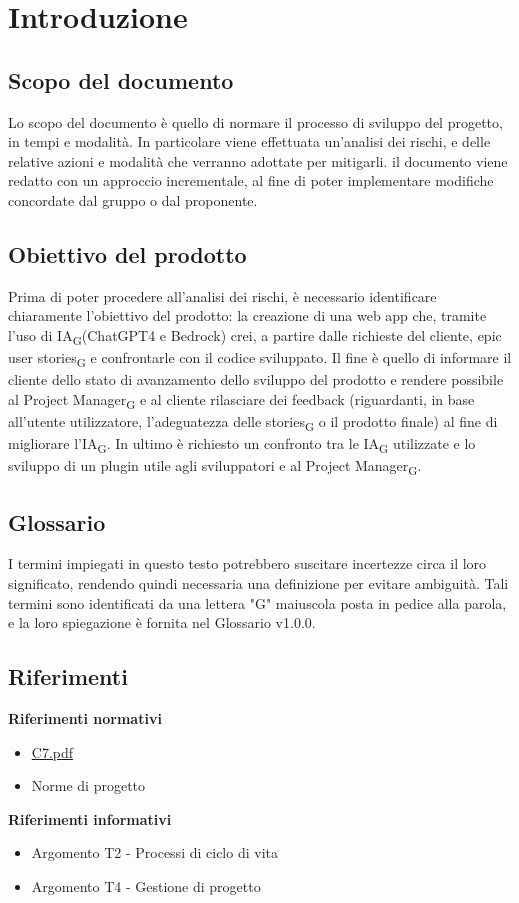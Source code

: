 \documentclass{article}
\begin{document}
\section{Introduzione}
\subsection{Scopo del documento}
Lo scopo del documento è quello di normare il processo di sviluppo del progetto, in tempi e modalità. In particolare viene effettuata un'analisi dei rischi, e delle relative azioni e modalità che verranno adottate per mitigarli. il documento viene redatto con un approccio incrementale, al fine di poter implementare modifiche concordate dal gruppo o dal proponente.

\subsection{Obiettivo del prodotto}
Prima di poter procedere all'analisi dei rischi, è necessario identificare chiaramente l'obiettivo del prodotto: la creazione di una web app che, tramite l’uso di IA\textsubscript{G}(ChatGPT4 e Bedrock) crei, a partire dalle richieste del cliente, epic user stories\textsubscript{G} e confrontarle con il codice sviluppato. Il fine è quello di informare il cliente dello stato di avanzamento dello sviluppo del prodotto e rendere possibile al Project Manager\textsubscript{G} e al cliente rilasciare dei
feedback (riguardanti, in base all'utente utilizzatore, l'adeguatezza delle stories\textsubscript{G} o il prodotto finale) al fine di migliorare l’IA\textsubscript{G}. In ultimo è richiesto un confronto tra le IA\textsubscript{G} utilizzate e lo sviluppo di un plugin utile agli sviluppatori e al Project Manager\textsubscript{G}.

\subsection{Glossario}
I termini impiegati in questo testo potrebbero suscitare incertezze circa il loro significato, rendendo quindi necessaria una definizione per evitare ambiguità. Tali termini sono identificati da una lettera "G" maiuscola posta in pedice alla parola, e la loro spiegazione è fornita nel Glossario v1.0.0.

\subsection{Riferimenti}
\textbf{Riferimenti normativi}
\begin{itemize}
        \item \href{https://www.math.unipd.it/~tullio/IS-1/2023/Progetto/C7.pdf}{C7.pdf}
        \item{Norme di progetto}
\end{itemize}
\textbf{Riferimenti informativi}
\begin{itemize}
        \item Argomento T2 - Processi di ciclo di vita
        \item Argomento T4 - Gestione di progetto
\end{itemize}
\end{document}
